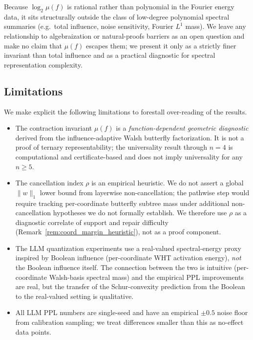 \documentclass[11pt]{article}
\begin{document}
Because $\log_2 \mu(f)$ is rational rather than polynomial in the Fourier energy data, it sits structurally outside the class of low-degree polynomial spectral summaries (e.g.\ total influence, noise sensitivity, Fourier $L^1$ mass). We leave any relationship to algebraization or natural-proofs barriers \cite{aaronson2009algebrization} as an open question and make no claim that $\mu(f)$ escapes them; we present it only as a strictly finer invariant than total influence and as a practical diagnostic for spectral representation complexity.

\subsection{Limitations}

We make explicit the following limitations to forestall over-reading of the results.
\begin{itemize}
    \item The contraction invariant $\mu(f)$ is a \emph{function-dependent geometric diagnostic} derived from the influence-adaptive Walsh butterfly factorization. It is not a proof of ternary representability; the universality result through $n=4$ is computational and certificate-based and does not imply universality for any $n \ge 5$.
    \item The cancellation index $\rho$ is an empirical heuristic. We do not assert a global $\|w\|_1$ lower bound from layerwise non-cancellation; the pathwise step would require tracking per-coordinate butterfly subtree mass under additional non-cancellation hypotheses we do not formally establish. We therefore use $\rho$ as a diagnostic correlate of support and repair difficulty (Remark~\ref{rem:coord_margin_heuristic}), not as a proof component.
    \item The LLM quantization experiments use a real-valued spectral-energy proxy inspired by Boolean influence (per-coordinate WHT activation energy), \emph{not} the Boolean influence itself. The connection between the two is intuitive (per-coordinate Walsh-basis spectral mass) and the empirical PPL improvements are real, but the transfer of the Schur-convexity prediction from the Boolean to the real-valued setting is qualitative.
    \item All LLM PPL numbers are single-seed and have an empirical $\pm 0.5$ noise floor from calibration sampling; we treat differences smaller than this as no-effect data points.
\end{itemize}
\end{document}
